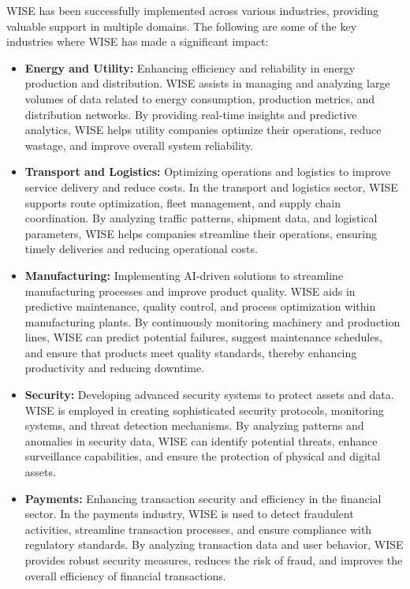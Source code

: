 WISE has been successfully implemented across various industries, providing valuable support in multiple domains. The following are some of the key industries where WISE has made a significant impact:

\begin{itemize}
    \item \textbf{Energy and Utility:} Enhancing efficiency and reliability in energy production and distribution. WISE assists in managing and analyzing large volumes of data related to energy consumption, production metrics, and distribution networks. By providing real-time insights and predictive analytics, WISE helps utility companies optimize their operations, reduce wastage, and improve overall system reliability.

    \item \textbf{Transport and Logistics:} Optimizing operations and logistics to improve service delivery and reduce costs. In the transport and logistics sector, WISE supports route optimization, fleet management, and supply chain coordination. By analyzing traffic patterns, shipment data, and logistical parameters, WISE helps companies streamline their operations, ensuring timely deliveries and reducing operational costs.

    \item \textbf{Manufacturing:} Implementing AI-driven solutions to streamline manufacturing processes and improve product quality. WISE aids in predictive maintenance, quality control, and process optimization within manufacturing plants. By continuously monitoring machinery and production lines, WISE can predict potential failures, suggest maintenance schedules, and ensure that products meet quality standards, thereby enhancing productivity and reducing downtime.

    \item \textbf{Security:} Developing advanced security systems to protect assets and data. WISE is employed in creating sophisticated security protocols, monitoring systems, and threat detection mechanisms. By analyzing patterns and anomalies in security data, WISE can identify potential threats, enhance surveillance capabilities, and ensure the protection of physical and digital assets.

    \item \textbf{Payments:} Enhancing transaction security and efficiency in the financial sector. In the payments industry, WISE is used to detect fraudulent activities, streamline transaction processes, and ensure compliance with regulatory standards. By analyzing transaction data and user behavior, WISE provides robust security measures, reduces the risk of fraud, and improves the overall efficiency of financial transactions.
\end{itemize}


